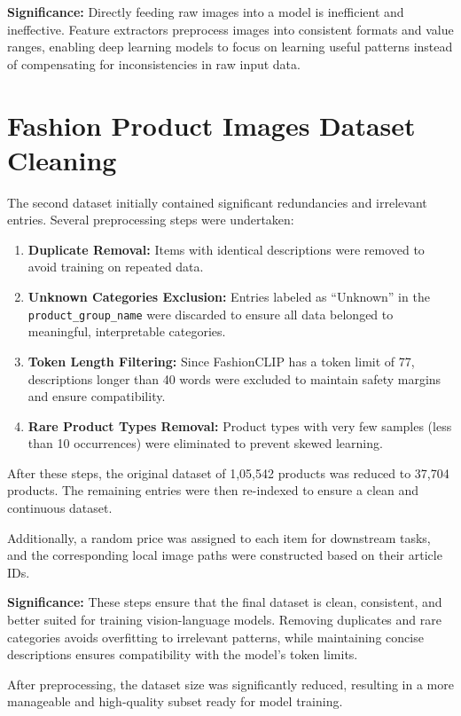 \textbf{Significance:} Directly feeding raw images into a model is inefficient and ineffective. Feature extractors preprocess images into consistent formats and value ranges, enabling deep learning models to focus on learning useful patterns instead of compensating for inconsistencies in raw input data.

\section{Fashion Product Images Dataset Cleaning}

The second dataset initially contained significant redundancies and irrelevant entries. Several preprocessing steps were undertaken:

\vspace{-1.25em}
\begin{enumerate}
    \setlength\itemsep{-1.05em}
    \item \textbf{Duplicate Removal:} Items with identical descriptions were removed to avoid training on repeated data.
    \item \textbf{Unknown Categories Exclusion:} Entries labeled as ``Unknown'' in the \texttt{product\_group\_name} were discarded to ensure all data belonged to meaningful, interpretable categories.
    \item \textbf{Token Length Filtering:} Since FashionCLIP has a token limit of 77, descriptions longer than 40 words were excluded to maintain safety margins and ensure compatibility.
    \item \textbf{Rare Product Types Removal:} Product types with very few samples (less than 10 occurrences) were eliminated to prevent skewed learning.
\end{enumerate}

After these steps, the original dataset of 1,05,542 products was reduced to 37,704 products. The remaining entries were then re-indexed to ensure a clean and continuous dataset.

Additionally, a random price was assigned to each item for downstream tasks, and the corresponding local image paths were constructed based on their article IDs.

\textbf{Significance:} These steps ensure that the final dataset is clean, consistent, and better suited for training vision-language models. Removing duplicates and rare categories avoids overfitting to irrelevant patterns, while maintaining concise descriptions ensures compatibility with the model's token limits.

After preprocessing, the dataset size was significantly reduced, resulting in a more manageable and high-quality subset ready for model training.
